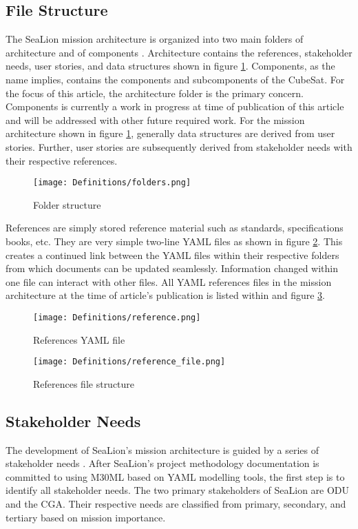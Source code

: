 \documentclass[journal,article,submit,pdftex,moreauthors]{Definitions/mdpi}
\begin{document}
\subsection{File Structure}
The SeaLion mission architecture is organized into two main folders of architecture and of components \cite{sealion_mission_architecture}.  Architecture contains the references, stakeholder needs, user stories, and data structures shown in figure \ref{fig:folders}.  Components, as the name implies, contains the components and subcomponents of the CubeSat.  For the focus of this article, the architecture folder is the primary concern.  Components is currently a work in progress at time of publication of this article and will be addressed with other future required work.  For the mission architecture shown in figure \ref{fig:folders}, generally data structures are derived from user stories.  Further, user stories are subsequently derived from stakeholder needs with their respective references.

\begin{figure}[H]
    \texttt{[image: Definitions/folders.png]}
    \caption{Folder structure}
	\label{fig:folders}
    \end{figure}
	\noindent   
\unskip

References are simply stored reference material such as standards, specifications books, etc.  They are very simple two-line YAML files as shown in figure \ref{fig:reference_yaml}.  This creates a continued link between the YAML files within their respective folders from which documents can be updated seamlessly.  Information changed within one file can interact with other files.  All YAML references files in the mission architecture at the time of article's publication is listed within and figure \ref{fig:reference_file}. 

\begin{figure}[H]
    \texttt{[image: Definitions/reference.png]}
    \caption{References YAML file}
	\label{fig:reference_yaml}
    \end{figure}   
\unskip

\begin{figure}[H]
    \texttt{[image: Definitions/reference\_file.png]}
    \caption{References file structure}
	\label{fig:reference_file}
    \end{figure}   
\unskip

\subsection{Stakeholder Needs}
The development of SeaLion's mission architecture is guided by a series of stakeholder needs \cite{sealion_dof}.  After SeaLion's project methodology documentation is committed to using M30ML based on YAML modelling tools, the first step is to identify all stakeholder needs.  The two primary stakeholders of SeaLion are ODU and the CGA.  Their respective needs are classified from primary, secondary, and tertiary based on mission importance.
\end{document}

